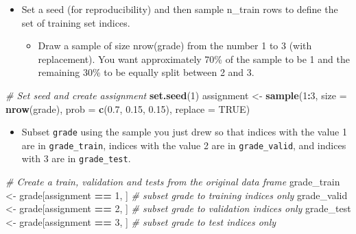 \documentclass[
]{book}
\newenvironment{Shaded}{\begin{snugshade}}{\end{snugshade}}
\newcommand{\CommentTok}[1]{\textcolor[rgb]{0.56,0.35,0.01}{\textit{#1}}}
\newcommand{\DataTypeTok}[1]{\textcolor[rgb]{0.13,0.29,0.53}{#1}}
\newcommand{\DecValTok}[1]{\textcolor[rgb]{0.00,0.00,0.81}{#1}}
\newcommand{\FloatTok}[1]{\textcolor[rgb]{0.00,0.00,0.81}{#1}}
\newcommand{\KeywordTok}[1]{\textcolor[rgb]{0.13,0.29,0.53}{\textbf{#1}}}
\newcommand{\NormalTok}[1]{#1}
\newcommand{\OperatorTok}[1]{\textcolor[rgb]{0.81,0.36,0.00}{\textbf{#1}}}
\newcommand{\OtherTok}[1]{\textcolor[rgb]{0.56,0.35,0.01}{#1}}
\newcommand{\StringTok}[1]{\textcolor[rgb]{0.31,0.60,0.02}{#1}}
\providecommand{\tightlist}{%
  \setlength{\itemsep}{0pt}\setlength{\parskip}{0pt}}
\begin{document}
\begin{itemize}
\tightlist
\item
  Set a seed (for reproducibility) and then sample n\_train rows to define the set of training set indices.

  \begin{itemize}
  \tightlist
  \item
    Draw a sample of size nrow(grade) from the number 1 to 3 (with replacement). You want approximately 70\% of the sample to be 1 and the remaining 30\% to be equally split between 2 and 3.
  \end{itemize}
\end{itemize}

\begin{Shaded}
\begin{Highlighting}[]
\CommentTok{# Set seed and create assignment}
\KeywordTok{set.seed}\NormalTok{(}\DecValTok{1}\NormalTok{)}
\NormalTok{assignment <-}\StringTok{ }\KeywordTok{sample}\NormalTok{(}\DecValTok{1}\OperatorTok{:}\DecValTok{3}\NormalTok{, }\DataTypeTok{size =} \KeywordTok{nrow}\NormalTok{(grade), }\DataTypeTok{prob =} \KeywordTok{c}\NormalTok{(}\FloatTok{0.7}\NormalTok{, }\FloatTok{0.15}\NormalTok{, }\FloatTok{0.15}\NormalTok{), }\DataTypeTok{replace =} \OtherTok{TRUE}\NormalTok{)}
\end{Highlighting}
\end{Shaded}

\begin{itemize}
\tightlist
\item
  Subset \texttt{grade} using the sample you just drew so that indices with the value 1 are in \texttt{grade\_train}, indices with the value 2 are in \texttt{grade\_valid}, and indices with 3 are in \texttt{grade\_test}.
\end{itemize}

\begin{Shaded}
\begin{Highlighting}[]
\CommentTok{# Create a train, validation and tests from the original data frame }
\NormalTok{grade_train <-}\StringTok{ }\NormalTok{grade[assignment }\OperatorTok{==}\StringTok{ }\DecValTok{1}\NormalTok{, ]    }\CommentTok{# subset grade to training indices only}
\NormalTok{grade_valid <-}\StringTok{ }\NormalTok{grade[assignment }\OperatorTok{==}\StringTok{ }\DecValTok{2}\NormalTok{, ]  }\CommentTok{# subset grade to validation indices only}
\NormalTok{grade_test <-}\StringTok{ }\NormalTok{grade[assignment }\OperatorTok{==}\StringTok{ }\DecValTok{3}\NormalTok{, ]   }\CommentTok{# subset grade to test indices only}
\end{Highlighting}
\end{Shaded}
\end{document}
